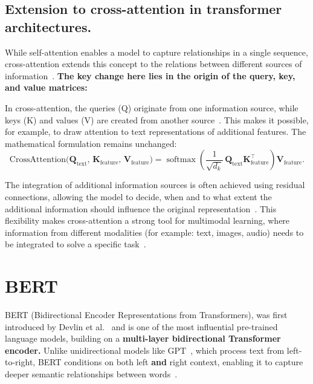 
\subsection{Extension to cross-attention in transformer architectures.}
While self-attention enables a model to capture relationships in a single sequence, cross-attention extends this concept to the relations between different sources of information~\parencite{vaswani2017attention}. \textbf{The key change here lies in the origin of the query, key, and value matrices:}

 In cross-attention, the queries (Q) originate from one information source, while keys (K) and values (V) are created from another source~\parencite{vaswani2017attention}. This makes it possible, for example, to draw attention to text representations of additional features. The mathematical formulation remains unchanged:
\[
\mathrm{CrossAttention}\bigl(\mathbf{Q}_{\text{text}},\, \mathbf{K}_{\text{feature}},\, \mathbf{V}_{\text{feature}}\bigr)
= \operatorname{softmax}\!\left(\frac{1}{\sqrt{d_k}}\, \mathbf{Q}_{\text{text}} \mathbf{K}_{\text{feature}}^{\top}\right) \mathbf{V}_{\text{feature}}.
\]

The integration of additional information sources is often achieved using residual connections, allowing the model to decide, when and to what extent the additional information should influence the original representation~\parencite{cai2025multimodal}. This flexibility makes cross-attention a strong tool for multimodal learning, where information from different modalities (for example: text, images, audio) needs to be integrated to solve a specific task~\parencite{li2024multimodal}. 


\section{BERT}

BERT (Bidirectional Encoder Representations from Transformers), was first introduced by Devlin et al.~\textcite{devlin2019bert} and is one of the most influential pre-trained language models, building on a \textbf{multi-layer bidirectional Transformer encoder.} Unlike unidirectional models like GPT~\parencite{radford2018gpt}, which process text from left-to-right, BERT conditions on both left \textbf{and} right context, enabling it to capture deeper semantic relationships between words~\parencite{rogers2020primerbertologyknowbert}.

